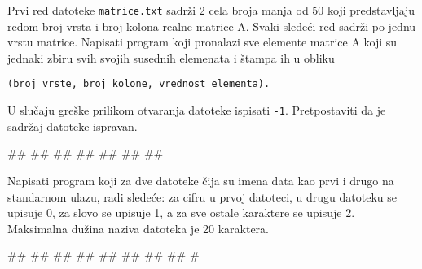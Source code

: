 \begin{Exercise}[label=p3_]         
Prvi red datoteke \verb|matrice.txt| sadr\v zi 2 cela broja manja od
50 koji predstavljaju redom broj vrsta i broj kolona realne matrice
A. Svaki slede\'ci red sadr\v zi po jednu vrstu matrice. Napisati
program koji pronalazi sve elemente matrice A koji su jednaki zbiru
svih svojih susednih elemenata i \v stampa ih u obliku
\begin{verbatim}
(broj vrste, broj kolone, vrednost elementa).
\end{verbatim}
U slu\v caju gre\v ske prilikom otvaranja datoteke ispisati {\tt -1}.
Pretpostaviti da je sadr\v zaj datoteke ispravan. \\
\begin{miditest}
\begin{upotreba}{1}
##
##
##
##
#\naslovIzlaz#
##
##
\end{upotreba}
\end{miditest}
\end{Exercise}
\ifresenja
\begin{Answer}[ref=p3_]
\end{Answer}
\fi


\begin{Exercise}[label=p3_]         
Napisati program koji za dve datoteke \v cija su imena data kao prvi i
drugo na standarnom ulazu, radi slede\'ce: za cifru u prvoj datoteci,
u drugu datoteku se upisuje 0, za slovo se upisuje 1, a za sve ostale
karaktere se upisuje 2. Maksimalna du\v zina naziva datoteka je 20
karaktera. \\
\begin{miditest}
\begin{upotreba}{2}
#\naslovInt#
##
##
##
##
##
##
##
#
\end{upotreba}
\end{miditest}
\end{Exercise}
\ifresenja
\begin{Answer}[ref=p3_]
\end{Answer}
\fi


